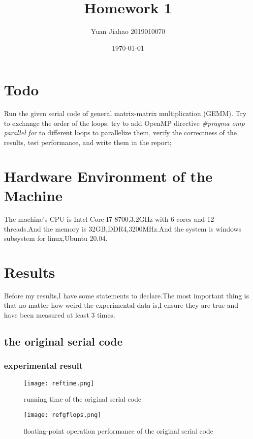 \documentclass[11pt]{scrartcl} %
\title{	
	Homework 1
}
\author{Yuan Jiahao 2019010070} %
\date{\normalsize\today} %
\begin{document}
\maketitle %


\section{Todo}
Run the given serial code of general matrix-matrix multiplication (GEMM). Try to
exchange the order of the loops, try to add OpenMP directive \textit{\#pragma omp parallel for} to
different loops to parallelize them, verify the correctness of the results, test performance, and
write them in the report;
\section{Hardware Environment of the Machine }
The machine's CPU is Intel Core I7-8700,3.2GHz with 6 cores and 12 threads.And the memory is 32GB,DDR4,3200MHz.And the system is windows subsystem for linux,Ubuntu 20.04.
\section{Results}
Before my results,I have some statements to declare.The most important thing is that no matter how weird the experimental data is,I ensure they are true and have been measured at least 3 times.\label{abcc}
\subsection{the original serial code}
	\subsubsection{experimental result}
		\begin{figure}[H]
			\centering
			\texttt{[image: reftime.png]}
			\caption{running time of the original serial code}
			\label{}
		\end{figure}
		\begin{figure}[H]
			\centering
			\texttt{[image: refgflops.png]}
			\caption{floating-point operation performance of the original serial code}
			\label{daf}
		\end{figure}
\end{document}
